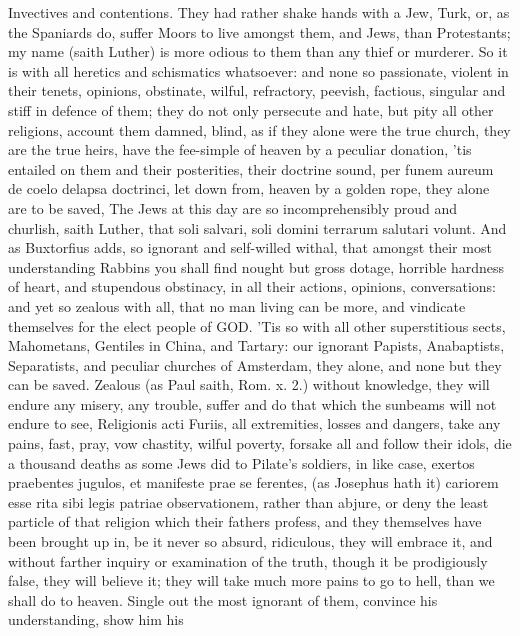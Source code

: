{Invectives and contentions. They had rather shake hands with a Jew,
Turk, or, as the Spaniards do, suffer Moors to live amongst them, and
Jews, than Protestants; my name (saith Luther) is more odious to
them than any thief or murderer. So it is with all heretics and
schismatics whatsoever: and none so passionate, violent in their
tenets, opinions, obstinate, wilful, refractory, peevish, factious,
singular and stiff in defence of them; they do not only persecute and
hate, but pity all other religions, account them damned, blind, as if
they alone were the true church, they are the true heirs, have the
fee-simple of heaven by a peculiar donation, 'tis entailed on them and
their posterities, their doctrine sound, per funem aureum de coelo
delapsa doctrinci, let down from, heaven by a golden rope, they alone
are to be saved, The Jews at this day are so incomprehensibly proud and
churlish, saith Luther, that soli salvari, soli domini terrarum
salutari volunt. And as Buxtorfius adds, so ignorant and
self-willed withal, that amongst their most understanding Rabbins you
shall find nought but gross dotage, horrible hardness of heart, and
stupendous obstinacy, in all their actions, opinions, conversations:
and yet so zealous with all, that no man living can be more, and
vindicate themselves for the elect people of \textsc{GOD}. 'Tis so with all
other superstitious sects, Mahometans, Gentiles in China, and Tartary:
our ignorant Papists, Anabaptists, Separatists, and peculiar churches
of Amsterdam, they alone, and none but they can be saved. Zealous
(as Paul saith, Rom. x. 2.) without knowledge, they will endure any
misery, any trouble, suffer and do that which the sunbeams will not
endure to see, Religionis acti Furiis, all extremities, losses and
dangers, take any pains, fast, pray, vow chastity, wilful poverty,
forsake all and follow their idols, die a thousand deaths as some Jews
did to Pilate's soldiers, in like case, exertos praebentes jugulos, et
manifeste prae se ferentes, (as Josephus hath it) cariorem esse rita
sibi legis patriae observationem, rather than abjure, or deny the least
particle of that religion which their fathers profess, and they
themselves have been brought up in, be it never so absurd, ridiculous,
they will embrace it, and without farther inquiry or examination of the
truth, though it be prodigiously false, they will believe it; they will
take much more pains to go to hell, than we shall do to heaven. Single
out the most ignorant of them, convince his understanding, show him his
}
